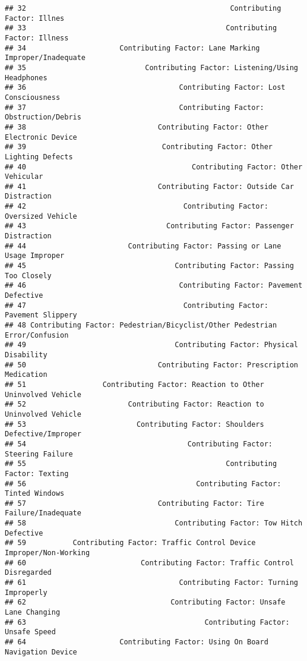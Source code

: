 \documentclass[10pt]{article}\usepackage[]{graphicx}\usepackage[]{xcolor}
\makeatletter
\newenvironment{kframe}{%
 \def\at@end@of@kframe{}%
 \ifinner\ifhmode%
  \def\at@end@of@kframe{\end{minipage}}%
  \begin{minipage}{\columnwidth}%
 \fi\fi%
 \def\FrameCommand##1{\hskip\@totalleftmargin \hskip-\fboxsep
 \colorbox{shadecolor}{##1}\hskip-\fboxsep
     \hskip-\linewidth \hskip-\@totalleftmargin \hskip\columnwidth}%
 \MakeFramed {\advance\hsize-\width
   \@totalleftmargin\z@ \linewidth\hsize
   \@setminipage}}%
 {\par\unskip\endMakeFramed%
 \at@end@of@kframe}
\newenvironment{knitrout}{}{} %
\makeatother
\begin{document}
\begin{knitrout}
\begin{kframe}
\begin{verbatim}
## 32                                                Contributing Factor: Illnes
## 33                                               Contributing Factor: Illness
## 34                      Contributing Factor: Lane Marking Improper/Inadequate
## 35                            Contributing Factor: Listening/Using Headphones
## 36                                    Contributing Factor: Lost Consciousness
## 37                                    Contributing Factor: Obstruction/Debris
## 38                               Contributing Factor: Other Electronic Device
## 39                                Contributing Factor: Other Lighting Defects
## 40                                       Contributing Factor: Other Vehicular
## 41                               Contributing Factor: Outside Car Distraction
## 42                                     Contributing Factor: Oversized Vehicle
## 43                                 Contributing Factor: Passenger Distraction
## 44                        Contributing Factor: Passing or Lane Usage Improper
## 45                                   Contributing Factor: Passing Too Closely
## 46                                    Contributing Factor: Pavement Defective
## 47                                     Contributing Factor: Pavement Slippery
## 48 Contributing Factor: Pedestrian/Bicyclist/Other Pedestrian Error/Confusion
## 49                                   Contributing Factor: Physical Disability
## 50                               Contributing Factor: Prescription Medication
## 51                  Contributing Factor: Reaction to Other Uninvolved Vehicle
## 52                        Contributing Factor: Reaction to Uninvolved Vehicle
## 53                          Contributing Factor: Shoulders Defective/Improper
## 54                                      Contributing Factor: Steering Failure
## 55                                               Contributing Factor: Texting
## 56                                        Contributing Factor: Tinted Windows
## 57                               Contributing Factor: Tire Failure/Inadequate
## 58                                   Contributing Factor: Tow Hitch Defective
## 59           Contributing Factor: Traffic Control Device Improper/Non-Working
## 60                           Contributing Factor: Traffic Control Disregarded
## 61                                    Contributing Factor: Turning Improperly
## 62                                  Contributing Factor: Unsafe Lane Changing
## 63                                          Contributing Factor: Unsafe Speed
## 64                      Contributing Factor: Using On Board Navigation Device

\end{verbatim}
\end{kframe}
\end{knitrout}
\end{document}
